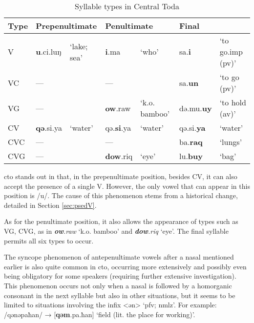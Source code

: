 \begin{table}[!htbp]
\centering
\caption{Syllable types in Central Toda}
\label{tab:sy_ty_cto}
\begin{tabular}{lllllll}
\hline
Type & \multicolumn{2}{l}{Prepenultimate} & \multicolumn{2}{l}{Penultimate} & \multicolumn{2}{l}{Final}                \\ \hline
V             & \textbf{u}.ci.luŋ & `lake; sea'    & \textbf{i}.ma            & `who'         & sa.\textbf{i}        & `to go.\acs{imp} (\acs{pv})' \\
VC            & ---              &                 & ---             &               & sa.\textbf{un}       & `to go (\acs{pv})'           \\
VG            & ---              &                 & \textbf{ow}.raw   & `k.o. bamboo' & də.mu.\textbf{uy} &  `to hold (\acs{av})'        \\
CV            & \textbf{qə}.si.ya         & `water'         & qə.\textbf{si}.ya        & `water'       & qə.si.\textbf{ya}    & `water'                    \\
CVC           & ---              &                 & ---             &               & ba.\textbf{raq}      & `lungs'                    \\
CVG           & ---              &                 & \textbf{dow}.riq     & `eye'    & lu.\textbf{buy}      & `bag'                     \\ \hline
\end{tabular}
\end{table}

\acl{cto} stands out in that, in the prepenultimate position, besides CV, it can also accept the presence of a single V. However, the only vowel that can appear in this position is /u/. The cause of this phenomenon stems from a historical change, detailed in Section \ref{sec:psedV}.

As for the penultimate position, it also allows the appearance of types such as VG, CVG, as in \textit{\textbf{ow}.raw} `k.o. bamboo' and \textit{\textbf{dow}.riq} `eye'. The final syllable permits all six types to occur.

The syncope phenomenon of antepenultimate vowels after a nasal mentioned earlier is also quite common in \acl{cto}, occurring more extensively and possibly even being obligatory for some speakers (requiring further extensive investigation). This phenomenon occurs not only when a nasal is followed by a homorganic consonant in the next syllable but also in other situations, but it seems to be limited to situations involving the infix <ən> `\acs{pfv}; \acs{nmlz}'. For example: /qənəpaħan/ → [\textbf{qəm}.pa.ħan] `field (lit. the place for working)'. 

